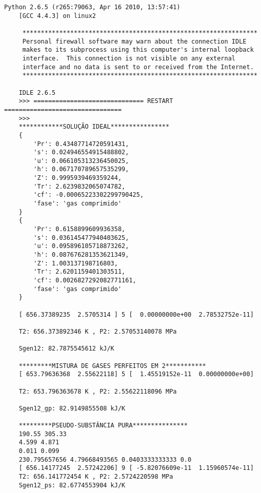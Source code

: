     \begin{Verbatim}[baselinestretch=1.0]
    Python 2.6.5 (r265:79063, Apr 16 2010, 13:57:41)
    [GCC 4.4.3] on linux2

     ****************************************************************
     Personal firewall software may warn about the connection IDLE
     makes to its subprocess using this computer's internal loopback
     interface.  This connection is not visible on any external
     interface and no data is sent to or received from the Internet.
     ****************************************************************

    IDLE 2.6.5
    >>> ============================== RESTART ================================
    >>>
    ************SOLUÇÃO IDEAL****************
    {
        'Pr': 0.43487714720591431,
        's': 0.024946554915488802,
        'u': 0.066105313236450025,
        'h': 0.067170789657535299,
        'Z': 0.9995939469359244,
        'Tr': 2.6239832065074782,
        'cf': -0.00065223302299790425,
        'fase': 'gas comprimido'
    }
    {
        'Pr': 0.6158899609936358,
        's': 0.036145477940403625,
        'u': 0.095896105718873262,
        'h': 0.087676281353621349,
        'Z': 1.003137198716803,
        'Tr': 2.6201159401303511,
        'cf': 0.0026827292082771161,
        'fase': 'gas comprimido'
    }

    [ 656.37389235  2.5705314 ] 5 [  0.00000000e+00  2.78532752e-11]

    T2: 656.373892346 K , P2: 2.57053140078 MPa

    Sgen12: 82.7875545612 kJ/K

    *********MISTURA DE GASES PERFEITOS EM 2***********
    [ 653.79636368  2.55622118] 5 [  1.45519152e-11  0.00000000e+00]

    T2: 653.796363678 K , P2: 2.55622118096 MPa

    Sgen12_gp: 82.9149855508 kJ/K

    *********PSEUDO-SUBSTÂNCIA PURA***************
    190.55 305.33
    4.599 4.871
    0.011 0.099
    230.795657656 4.79668493565 0.0403333333333 0.0
    [ 656.14177245  2.57242206] 9 [ -5.82076609e-11  1.15960574e-11]
    T2: 656.141772454 K , P2: 2.5724220598 MPa
    Sgen12_ps: 82.6774553904 kJ/K
    \end{Verbatim}

